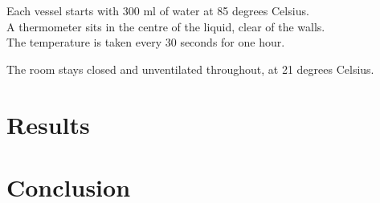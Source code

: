 \documentclass[a4paper,11pt]{article}
\begin{document}

Each vessel starts with 300 ml of water at 85 degrees Celsius. \\
A thermometer sits in the centre of the liquid, clear of the walls. \\
The temperature is taken every 30 seconds for one hour.

\noindent
The room stays closed and unventilated throughout, at 21 degrees Celsius.


\section{Results}\label{sec:results}

\section{Conclusion}\label{sec:conclusion}
\end{document}
